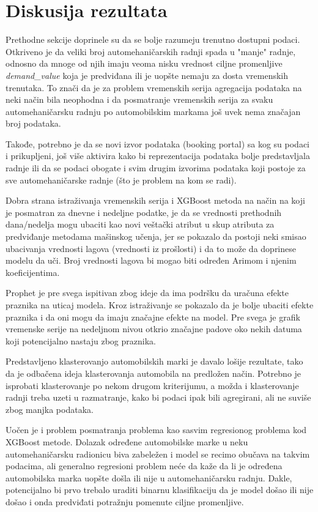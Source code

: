 \documentclass[12pt,oneside]{memoir}
\begin{document}
\section{Diskusija rezultata}
Prethodne sekcije doprinele su da se bolje razumeju trenutno dostupni podaci. Otkriveno je da veliki broj automehaničarskih radnji spada u "manje" radnje, odnosno da mnoge od njih imaju veoma nisku vrednost ciljne promenljive \textit{demand\_value} koja je predviđana ili je uopšte nemaju za dosta vremenskih trenutaka. To znači da je za problem vremenskih serija agregacija podataka na neki način bila neophodna i da posmatranje vremenskih serija za svaku automehaničarsku radnju po automobilskim markama još uvek nema značajan broj podataka.

Takođe, potrebno je da se novi izvor podataka (booking portal) sa kog su podaci i prikupljeni, još više aktivira kako bi reprezentacija podataka bolje predstavljala radnje ili da se podaci obogate i svim drugim izvorima podataka koji postoje za sve automehaničarske radnje (što je problem na kom se radi).

Dobra strana istraživanja vremenskih serija i XGBoost metoda na način na koji je posmatran za dnevne i nedeljne podatke, je da se vrednosti prethodnih dana/nedelja mogu ubaciti kao novi veštački atribut u skup atributa za predviđanje metodama mašinskog učenja, jer se pokazalo da postoji neki smisao ubacivanja vrednosti lagova (vrednosti iz prošlosti) i da to može da doprinese modelu da uči. Broj vrednosti lagova bi mogao biti određen Arimom i njenim koeficijentima.

Prophet je pre svega ispitivan zbog ideje da ima podršku da uračuna efekte praznika na uticaj modela. Kroz istraživanje se pokazalo da je bolje ubaciti efekte praznika i da oni mogu da imaju značajne efekte na model. Pre svega je grafik vremenske serije na nedeljnom nivou otkrio značajne padove oko nekih datuma koji potencijalno nastaju zbog praznika.

Predstavljeno klasterovanjo automobilskih marki je davalo lošije rezultate, tako da je odbačena ideja klasterovanja automobila na predložen način. Potrebno je isprobati klasterovanje po nekom drugom kriterijumu, a možda i klasterovanje radnji treba uzeti u razmatranje, kako bi podaci ipak bili agregirani, ali ne suviše zbog manjka podataka. 

Uočen je i problem posmatranja problema kao sasvim regresionog problema kod XGBoost metode. Dolazak određene automobilske marke u neku automehaničarsku radionicu biva zabeležen i model se recimo obučava na takvim podacima, ali generalno regresioni problem neće da kaže da li je određena automobilska marka uopšte došla ili nije u automehaničarsku radnju. Dakle, potencijalno bi prvo trebalo uraditi binarnu klasifikaciju da je model došao ili nije došao i onda predviđati potražnju pomenute ciljne promenljive.
\end{document}
